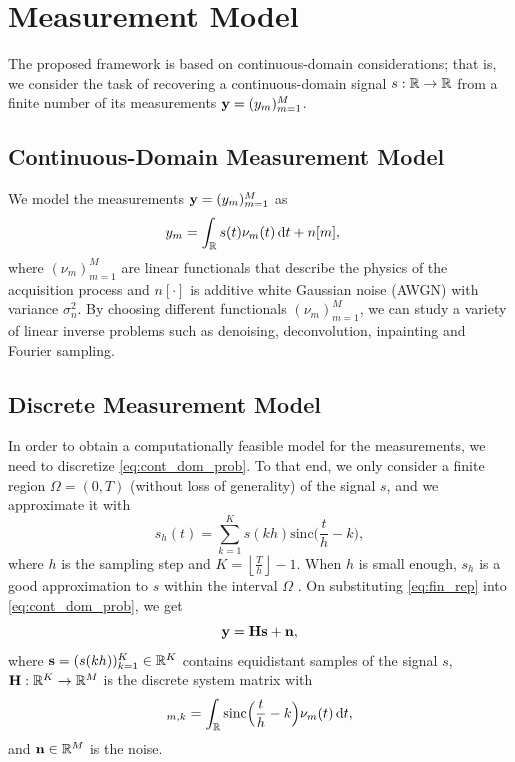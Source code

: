 \documentclass[journal]{IEEEtran}
\begin{document}
\section{Measurement Model}
The proposed framework is based on continuous-domain considerations; that is, we consider the task of recovering a continuous-domain signal $s:\mathbb{R} \rightarrow \mathbb{R}$ from a finite number of its measurements ${\bf{y}} = (y_m)_{m=1}^{M}$.


\subsection{Continuous-Domain Measurement Model}
We model the measurements ${\bf{y}} = (y_m)_{m=1}^{M}$ as
\begin{align}\label{eq:cont_dom_prob}
    y_m &=  \int_{\mathbb{R}} s(t)\nu_m(t) \,\mathrm{d} t + n[m],
\end{align}
where $(\nu_m)_{m=1}^{M}$ are linear functionals that describe the physics of the acquisition process and $n[\cdot]$ is additive white Gaussian noise (AWGN) with variance $\sigma_{n}^{2}$. By choosing different functionals $(\nu_m)_{m=1}^{M}$, we can study a variety of linear inverse problems such as denoising, deconvolution, inpainting and Fourier sampling.


\subsection{Discrete Measurement Model}
In order to obtain a computationally feasible model for the measurements, we need to discretize \eqref{eq:cont_dom_prob}. To that end, we only consider a finite region $\Omega = (0,T)$ (without loss of generality) of the signal $s$, and we approximate it with
\begin{equation}\label{eq:fin_rep}
    s_h(t) = \sum\limits_{k=1}^{K} s(kh)\text{sinc}\Big(\frac{t}{h} - k\Big),
\end{equation}
where $h$ is the sampling step and $K = \left\lfloor \frac{T}{h} \right \rfloor - 1$. When $h$ is small enough, $s_h$ is a good approximation to $s$ within the interval $\Omega$ \cite{unser2000sampling}. On substituting \eqref{eq:fin_rep} into \eqref{eq:cont_dom_prob}, we get
\begin{equation}\label{eq:discrete_1}
    {\bf{y}} = {\bf{H}} {\bf{s}} + {\bf{n}},
\end{equation}
where ${\bf{s}} = (s(kh))_{k=1}^{K} \in \mathbb{R}^K$ contains equidistant samples of the signal $s$, ${\bf{H}}: \mathbb{R}^K \rightarrow \mathbb{R}^M$ is the discrete system matrix with
\begin{equation}
    [\M H]_{m,k} = \int_{\R} \text{sinc}\Big(\frac{t}{h} - k\Big) \nu_m(t) \ud t,
\end{equation}
and ${\bf{n}} \in \mathbb{R}^M$ is the noise.
\end{document}
